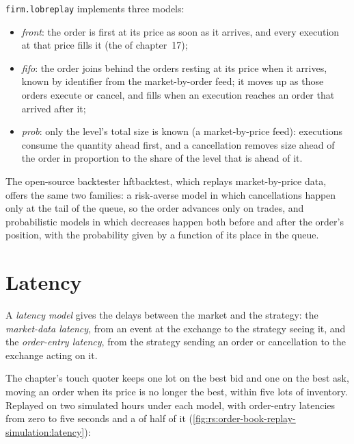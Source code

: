 \texttt{firm.lobreplay} implements three models:
\begin{itemize}
\item \emph{front}: the order is first at its price as soon as it arrives, and every execution at that price fills it (the  of chapter~17);
\item \emph{fifo}: the order joins behind the orders resting at its price when it arrives, known by identifier from the market-by-order feed; it moves
up as those orders execute or cancel, and fills when an execution reaches an order that arrived after it;
\item \emph{prob}: only the level's total size is known (a market-by-price feed): executions consume the quantity ahead first, and a cancellation
removes size ahead of the order in proportion to the share of the level that is ahead of it.
\end{itemize}
The open-source backtester hftbacktest, which replays market-by-price data, offers the same two families: a risk-averse model in which cancellations
happen only at the tail of the queue, so the order advances only on trades, and probabilistic models in which decreases happen both before and after
the order's position, with the probability given by a function of its place in the queue.

\section{Latency}

\begin{definition}\label{def:rs:order-book-replay-simulation:latency}
A \emph{latency model} gives the delays between the market and the strategy: the \emph{market-data latency}, from an event at the exchange to the strategy seeing it, and the \emph{order-entry latency}, from the strategy
sending an order or cancellation to the exchange acting on it.
\end{definition}

The chapter's touch quoter keeps one lot on the best bid and one on the best ask, moving an order when its price is no longer the best, within five lots
of inventory. Replayed on two simulated hours under each model, with order-entry latencies from zero to five seconds and a  of half
of it (\cref{fig:rs:order-book-replay-simulation:latency}):

